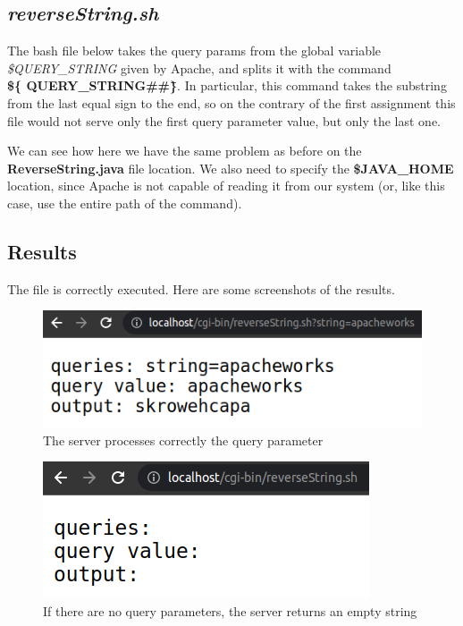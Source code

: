 \documentclass[12pt, a4paper]{article}
\begin{document}
  \subsection{\textit{reverseString.sh}}
  The bash file below takes the query params from the global variable \\\textit{\$QUERY\_STRING} given by Apache, and splits it with the command \\\textbf{\$\{ QUERY\_STRING\#\#\*\=\}}. In particular, this command takes the substring from the last equal sign to the end, so on the contrary of the first assignment this file would not serve only the first query parameter value, but only the last one.

  We can see how here we have the same problem as before on the \textbf{ReverseString.java} file location. We also need to specify the \textbf{\$JAVA\_HOME} location, since Apache is not capable of reading it from our system (or, like this case, use the entire path of the command).

  
  
  \subsection{Results}

  The file is correctly executed. Here are some screenshots of the results.

  \begin{figure}[H]
    \centering
    \includegraphics[scale=0.75]{apache_ok.png}
    \caption{The server processes correctly the query parameter}
  \end{figure}

  \begin{figure}[H]
    \centering
    \includegraphics[scale=1]{apache_no_query.png}
    \caption{If there are no query parameters, the server returns an empty string}
  \end{figure} 
\end{document}
